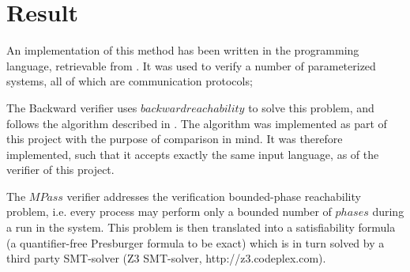 \section{Result}
An implementation of this method has been written in the \cite{Haskell} programming language, retrievable from . It was used to verify a number of parameterized systems, all of which are communication protocols;

\vspace{10pt}
\vspace{10pt}

The Backward verifier uses $backward reachability$ to solve this problem, and follows the algorithm described in \cite{287591}. The algorithm was implemented as part of this project with the purpose of comparison in mind. It was therefore implemented, such that it accepts exactly the same input language, as of the verifier of this project.

The $MPass$ verifier addresses the verification bounded-phase reachability problem, i.e. every process may perform only a bounded number of $phases$ during a run in the system. This problem is then translated into a satisfiability formula (a quantifier-free Presburger formula to be exact) which is in turn solved by a third party SMT-solver (Z3 SMT-solver, http://z3.codeplex.com).

